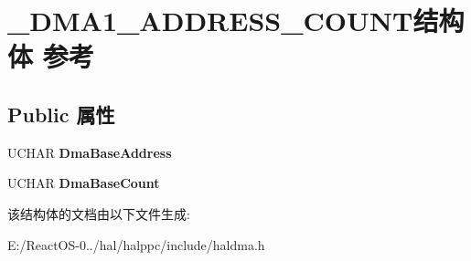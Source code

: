 \hypertarget{struct___d_m_a1___a_d_d_r_e_s_s___c_o_u_n_t}{}\section{\+\_\+\+D\+M\+A1\+\_\+\+A\+D\+D\+R\+E\+S\+S\+\_\+\+C\+O\+U\+N\+T结构体 参考}
\label{struct___d_m_a1___a_d_d_r_e_s_s___c_o_u_n_t}
\subsection*{Public 属性}
\begin{DoxyCompactItemize}
\item 
\mbox{\label{struct___d_m_a1___a_d_d_r_e_s_s___c_o_u_n_t_a5a3c9e17375170dac3110e06067dfece}} 
U\+C\+H\+AR {\bfseries Dma\+Base\+Address}
\item 
\mbox{\label{struct___d_m_a1___a_d_d_r_e_s_s___c_o_u_n_t_ae0e54d5278300bd97e7e063a8fa8e57d}} 
U\+C\+H\+AR {\bfseries Dma\+Base\+Count}
\end{DoxyCompactItemize}


该结构体的文档由以下文件生成\+:\begin{DoxyCompactItemize}
\item 
E\+:/\+React\+O\+S-\/0../hal/halppc/include/haldma.\+h\end{DoxyCompactItemize}
